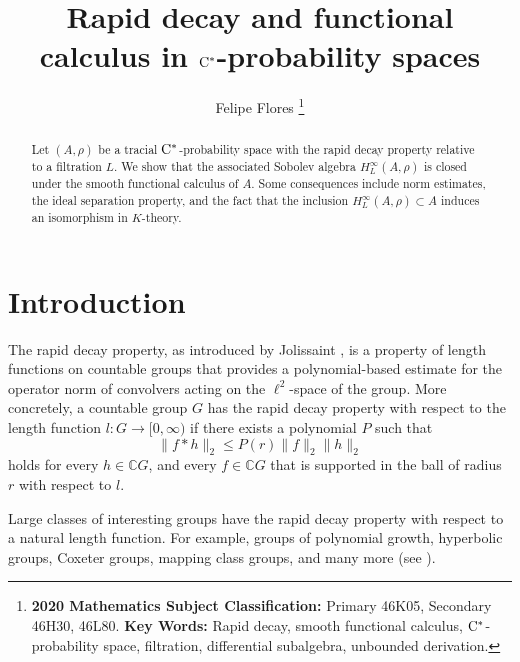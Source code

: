 \documentclass[11pt]{article}
\date{}
\theoremstyle{definition}
\theoremstyle{remark}
\numberwithin{equation}{section}
\numberwithin{equation}{section}
\def\CC{\mathbb C}
\numberwithin{equation}{section}
\begin{document}
\title{Rapid decay and functional calculus in ${\rm C}^*$-probability spaces}


\author{Felipe Flores
\footnote{
\textbf{2020 Mathematics Subject Classification:} Primary 46K05, Secondary 46H30, 46L80.
\newline
\textbf{Key Words:} Rapid decay, smooth functional calculus, ${\rm C}^*$-probability space, filtration, differential subalgebra, unbounded derivation. }
}

\maketitle


\begin{abstract}\setlength{\parindent}{0pt}\setlength{\parskip}{1ex}\noindent
 Let $(A,\rho)$ be a tracial ${\rm C}^*$-probability space with the rapid decay property relative to a filtration $L$. We show that the associated Sobolev algebra $H_L^{\infty}(A,\rho)$ is closed under the smooth functional calculus of $A$. Some consequences include norm estimates, the ideal separation property, and the fact that the inclusion $H_L^{\infty}(A,\rho)\subset A$ induces an isomorphism in $K$-theory.
\end{abstract}


\section{Introduction}


The rapid decay property, as introduced by Jolissaint \cite{Jo89,Jo90}, is a property of length functions on countable groups that provides a polynomial-based estimate for the operator norm of convolvers acting on the $\ell^2$-space of the group. More concretely, a countable group $G$ has the rapid decay property with respect to the length function $l:G\to[0,\infty)$ if there exists a polynomial $P$ such that 
$$
\|f*h\|_2\leq P(r)\|f\|_2\|h\|_2
$$
holds for every $h\in \CC G$, and every $f\in\CC G$ that is supported in the ball of radius $r$ with respect to $l$. 

Large classes of interesting groups have the rapid decay property with respect to a natural length function. For example, groups of polynomial growth, hyperbolic groups, Coxeter groups, mapping class groups, and many more (see \cite{Ch17}).
\end{document}
